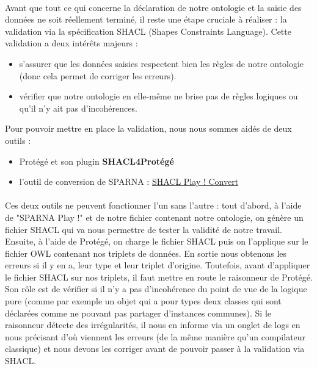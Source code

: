 \paragraph{} \hspace{10mm}
Avant que tout ce qui concerne la déclaration de notre ontologie et la saisie des données ne soit réellement terminé, il reste une étape cruciale à réaliser : la validation via la spécification SHACL (Shapes Constraints Language). Cette validation a deux intérêts majeurs :
\begin{itemize}
    \item[\ding{103}] s'assurer que les données saisies respectent bien les règles de notre ontologie (donc cela permet de corriger les erreurs).
    \item[\ding{103}] vérifier que notre ontologie en elle-même ne brise pas de règles logiques ou qu'il n'y ait pas d'incohérences.
\end{itemize}

\vspace{10mm}
Pour pouvoir mettre en place la validation, nous nous sommes aidés de deux outils :
\begin{itemize}
    \item[\ding{103}] Protégé et son plugin \textbf{SHACL4Protégé}
    \item[\ding{103}] l'outil de conversion de SPARNA : \hyperlink{https://shacl-play.sparna.fr/play/convert}{SHACL Play ! Convert}
\end{itemize}

\paragraph{} \hspace{10mm}
Ces deux outils ne peuvent fonctionner l'un sans l'autre : tout d'abord, à l'aide de "SPARNA Play !" et de notre fichier contenant notre ontologie, on génère un fichier SHACL qui va nous permettre de tester la validité de notre travail. Ensuite, à l'aide de Protégé, on charge le fichier SHACL puis on l'applique sur le fichier OWL contenant nos triplets de données. En sortie nous obtenons les erreurs si il y en a, leur type et leur triplet d'origine. Toutefois, avant d'appliquer le fichier SHACL sur nos triplets, il faut mettre en route le raisonneur de Protégé. Son rôle est de vérifier si il n'y a pas d'incohérence du point de vue de la logique pure (comme par exemple un objet qui a pour types deux classes qui sont déclarées comme ne pouvant pas partager d'instances communes). Si le raisonneur détecte des irrégularités, il nous en informe via un onglet de logs en nous précisant d'où viennent les erreurs (de la même manière qu'un compilateur classique) et nous devons les corriger avant de pouvoir passer à la validation via SHACL.
